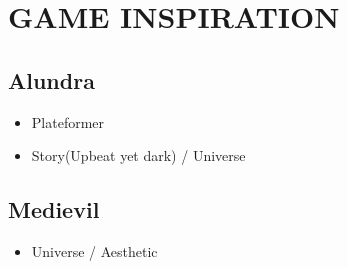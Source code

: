 \documentclass{report}
\begin{document}



\chapter{GAME INSPIRATION}

	\section*{Alundra}
		\begin{itemize}
			\item Plateformer
			\item Story(Upbeat yet dark) / Universe
		\end{itemize}

	\section*{Medievil}
		\begin{itemize}
			\item Universe / Aesthetic
		\end{itemize}
\end{document}
